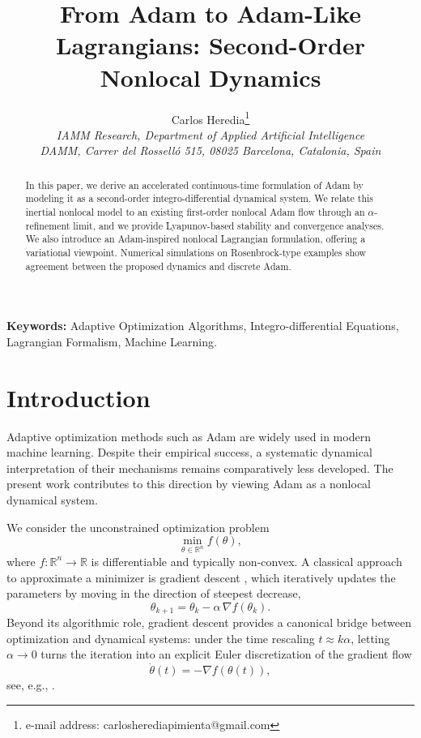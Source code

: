 \documentclass{article} %
\title{From Adam to Adam-Like Lagrangians: Second-Order Nonlocal Dynamics}
\author{
Carlos Heredia\thanks{e-mail address: carlosherediapimienta@gmail.com} \\
\textit{IAMM Research, Department of Applied Artificial Intelligence} \\
\textit{DAMM, Carrer del Rossell\'o 515, 08025 Barcelona, Catalonia, Spain}
}
\begin{document}
\maketitle

\begin{abstract}
In this paper, we derive an accelerated continuous-time formulation of Adam by modeling it as a second-order integro-differential dynamical system. We relate this inertial nonlocal model to an existing first-order nonlocal Adam flow through an $\alpha$-refinement limit, and we provide Lyapunov-based stability and convergence analyses. We also introduce an Adam-inspired nonlocal Lagrangian formulation, offering a variational viewpoint. Numerical simulations on Rosenbrock-type examples show agreement between the proposed dynamics and discrete Adam. 
\end{abstract}

\noindent \textbf{Keywords:} Adaptive Optimization Algorithms, Integro-differential Equations, Lagrangian Formalism, Machine Learning.

\section{Introduction}

Adaptive optimization methods such as Adam \cite{kingma2014} are widely used in modern machine learning. Despite their empirical success, a systematic dynamical interpretation of their mechanisms remains comparatively less developed. The present work contributes to this direction by viewing Adam as a nonlocal dynamical system.

We consider the unconstrained optimization problem
\[
\min_{\theta \in \mathbb{R}^n} f(\theta),
\]
where $f:\mathbb{R}^n \to \mathbb{R}$ is differentiable and typically non-convex. A classical approach to approximate a minimizer is gradient descent \cite{Rumelhart1986}, which iteratively updates the parameters by moving in the direction of steepest decrease,
\[
\theta_{k+1}=\theta_k-\alpha\,\nabla f(\theta_k).
\]
Beyond its algorithmic role, gradient descent provides a canonical bridge between optimization and dynamical systems: under the time rescaling $t\approx k\alpha$, letting $\alpha\to 0$ turns the iteration into an explicit Euler discretization of the gradient flow
\begin{equation}\label{ref:gradient_flow}
\dot{\theta}(t)=-\nabla f(\theta(t)),    
\end{equation}
see, e.g., \cite{boyd2004}.
\end{document}
